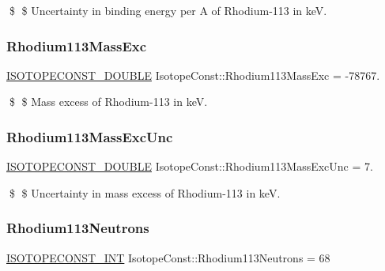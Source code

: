 \$ \$ Uncertainty in binding energy per A of Rhodium-\/113 in keV. \mbox{\label{group___isotope_const-_rhodium-_rh113_ga2ba7581302835d311082ee32f2409c3a}} 
\subsubsection{\texorpdfstring{Rhodium113\+Mass\+Exc}{Rhodium113MassExc}}
{\footnotesize\ttfamily \mbox{\hyperlink{group___isotope_const-_macros_ga8f45a7272ce02c0b4c65c44636ed719a}{I\+S\+O\+T\+O\+P\+E\+C\+O\+N\+S\+T\+\_\+\+D\+O\+U\+B\+LE}} Isotope\+Const\+::\+Rhodium113\+Mass\+Exc = -\/78767.}

\$ \$ Mass excess of Rhodium-\/113 in keV. \mbox{\label{group___isotope_const-_rhodium-_rh113_ga54198fc42790f24c21be9aba557f8866}} 
\subsubsection{\texorpdfstring{Rhodium113\+Mass\+Exc\+Unc}{Rhodium113MassExcUnc}}
{\footnotesize\ttfamily \mbox{\hyperlink{group___isotope_const-_macros_ga8f45a7272ce02c0b4c65c44636ed719a}{I\+S\+O\+T\+O\+P\+E\+C\+O\+N\+S\+T\+\_\+\+D\+O\+U\+B\+LE}} Isotope\+Const\+::\+Rhodium113\+Mass\+Exc\+Unc = 7.}

\$ \$ Uncertainty in mass excess of Rhodium-\/113 in keV. \mbox{\label{group___isotope_const-_rhodium-_rh113_ga1ba61987ae6e769582b290d6a96e09bc}} 
\subsubsection{\texorpdfstring{Rhodium113\+Neutrons}{Rhodium113Neutrons}}
{\footnotesize\ttfamily \mbox{\hyperlink{group___isotope_const-_macros_ga5f18360b3e99483a35c32d789e62621c}{I\+S\+O\+T\+O\+P\+E\+C\+O\+N\+S\+T\+\_\+\+I\+NT}} Isotope\+Const\+::\+Rhodium113\+Neutrons = 68}

